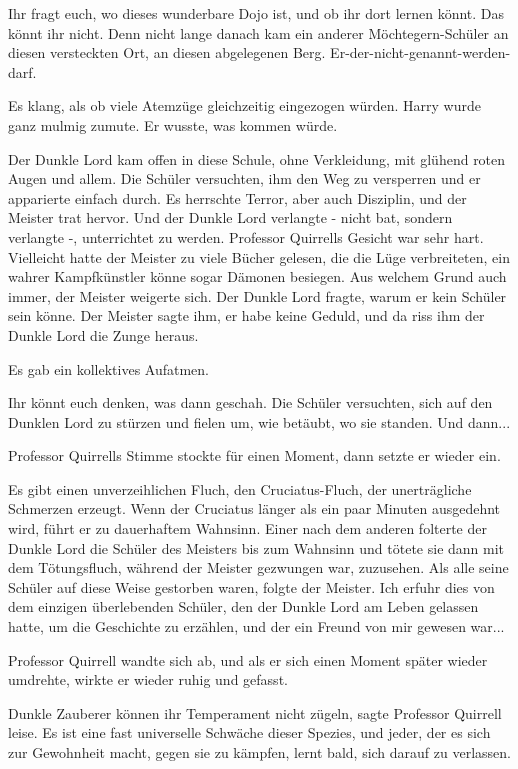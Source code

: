 \glqq Ihr fragt euch, wo dieses wunderbare Dojo ist, und ob ihr dort lernen
könnt. Das könnt ihr nicht. Denn nicht lange danach kam ein anderer
Möchtegern-Schüler an diesen versteckten Ort, an diesen abgelegenen Berg.
Er-der-nicht-genannt-werden-darf.\grqq{}

Es klang, als ob viele Atemzüge gleichzeitig eingezogen würden. Harry wurde ganz
mulmig zumute. Er wusste, was kommen würde.

\glqq Der Dunkle Lord kam offen in diese Schule, ohne Verkleidung, mit glühend
roten Augen und allem. Die Schüler versuchten, ihm den Weg zu versperren und er
apparierte einfach durch. Es herrschte Terror, aber auch Disziplin, und der
Meister trat hervor. Und der Dunkle Lord verlangte - nicht bat, sondern
verlangte -, unterrichtet zu werden.\grqq{} Professor Quirrells Gesicht war sehr
hart. \glqq Vielleicht hatte der Meister zu viele Bücher gelesen, die die Lüge
verbreiteten, ein wahrer Kampfkünstler könne sogar Dämonen besiegen. Aus welchem
Grund auch immer, der Meister weigerte sich. Der Dunkle Lord fragte, warum er
kein Schüler sein könne. Der Meister sagte ihm, er habe keine Geduld, und da
riss ihm der Dunkle Lord die Zunge heraus.\grqq{}

Es gab ein kollektives Aufatmen.

\glqq Ihr könnt euch denken, was dann geschah. Die Schüler versuchten, sich auf
den Dunklen Lord zu stürzen und fielen um, wie betäubt, wo sie standen. Und
dann...\grqq{}

Professor Quirrells Stimme stockte für einen Moment, dann setzte er wieder ein.

\glqq Es gibt einen unverzeihlichen Fluch, den Cruciatus-Fluch, der
unerträgliche Schmerzen erzeugt. Wenn der Cruciatus länger als ein paar Minuten
ausgedehnt wird, führt er zu dauerhaftem Wahnsinn. Einer nach dem anderen
folterte der Dunkle Lord die Schüler des Meisters bis zum Wahnsinn und tötete
sie dann mit dem Tötungsfluch, während der Meister gezwungen war, zuzusehen. Als
alle seine Schüler auf diese Weise gestorben waren, folgte der Meister. Ich
erfuhr dies von dem einzigen überlebenden Schüler, den der Dunkle Lord am Leben
gelassen hatte, um die Geschichte zu erzählen, und der ein Freund von mir
gewesen war...\grqq{}

Professor Quirrell wandte sich ab, und als er sich einen Moment später wieder
umdrehte, wirkte er wieder ruhig und gefasst.

\glqq Dunkle Zauberer können ihr Temperament nicht zügeln\grqq{}, sagte
Professor Quirrell leise. \glqq Es ist eine fast universelle Schwäche dieser
Spezies, und jeder, der es sich zur Gewohnheit macht, gegen sie zu kämpfen,
lernt bald, sich darauf zu verlassen.


